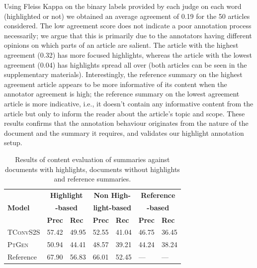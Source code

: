\documentclass[11pt,a4paper]{article}
\newcommand\ptgen{\textsc{PtGen}}
\newcommand\tconv{\textsc{TConvS2S}}
\begin{document}
Using Fleiss Kappa \citep{Josep1971} on the binary labels provided by each judge on each word (highlighted or not) we obtained an average agreement of 0.19 for the 50 articles considered. The low agreement score does not indicate a poor annotation process necessarily; we argue that this is primarily due to the annotators having different opinions on which parts of an article are salient. The article with the highest agreement (0.32) has more focused highlights, whereas the article with the lowest agreement (0.04) has highlights spread all over (both articles can be seen in the supplementary materials). Interestingly, the reference summary on the highest agreement article appears to be more informative of its content when the annotator agreement is high; the reference summary on the lowest agreement article is more indicative, i.e., it doesn’t contain any informative content from the article but only to inform the reader about the article’s topic and scope. These results confirms that the annotation behaviour originates from the nature of the document and the summary it requires, and validates our highlight annotation setup.

\begin{table}[t!]
\small
\begin{tabular}{l|p{0.4cm}p{0.6cm}|p{0.4cm}p{0.4cm}|p{0.4cm}p{0.4cm}}
\hline
\multirow{3}{*}{\textbf{Model}}                & \multicolumn{2}{c|}{\textbf{Highlight}}                              & \multicolumn{2}{c|}{\textbf{Non High-}} & 
\multicolumn{2}{c}{\textbf{Reference}}\\
\multirow{2}{*}{}                
& \multicolumn{2}{c|}{\textbf{-based}}                              & \multicolumn{2}{c|}{\textbf{light-based}} & 
\multicolumn{2}{c}{\textbf{-based}}\\
& \textbf{Prec} & \textbf{Rec} 
& \textbf{Prec} & \textbf{Rec}
& \textbf{Prec} & \textbf{Rec} \\ \hline
\tconv{} & 57.42 & 49.95 & 52.55 & 41.04 & 46.75 & 36.45             \\
\ptgen{} & 50.94 & 44.41 & 48.57 & 39.21  & 44.24 & 38.24             \\
Reference & 67.90 & 56.83 & 66.01 & 52.45  & --- & --- \\
\hline
\end{tabular}
\caption{Results of content evaluation of summaries against documents with highlights, documents without highlights and reference summaries.}
\label{table:summresult}
\end{table}
\end{document}
